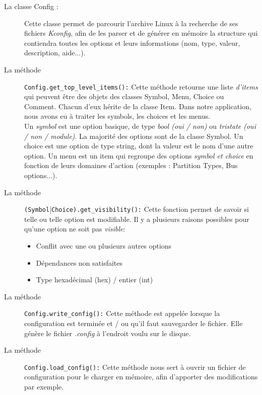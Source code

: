 \documentclass[17pts]{report}
\begin{document}
\begin{description}
    \item[La classe Config :] Cette classe permet de parcourir l'archive Linux
        à la recherche de ses fichiers \textit{Kconfig}, afin de les parser et
        de générer en mémoire la structure qui contiendra toutes les options et
        leurs informations (nom, type, valeur, description, aide...).
    \item[La méthode ] \verb|Config.get_top_level_items():| Cette méthode
        retourne une liste \textit{d'items} qui peuvent être des objets des
        classes Symbol, Menu, Choice ou Comment. Chacun d'eux hérite de la
        classe Item.  Dans notre application, nous avons eu à traiter les
        symbols, les choices et les menus.\\

        Un \textit{symbol} est une option basique, de type \textit{bool (oui /
        non)} ou \textit{tristate (oui / non / module)}. La majorité des
        options sont de la classe Symbol.  Un choice est une option de type
        string, dont la valeur est le nom d'une autre option.  Un menu est un
        item qui regroupe des options \textit{symbol et choice} en fonction de
        leurs domaines d'action (exemples : Partition Types, Bus options...).
    \item[La méthode ] \verb|(Symbol||\verb|Choice).get_visibility():| Cette
        fonction permet  de savoir si telle ou telle option est modifiable. Il
        y a plusieurs raisons possibles pour qu'une option ne soit pas
        \textit{visible}:
        \begin{itemize}
            \item Conflit avec une ou plusieurs autres options
            \item Dépendances non satisfaites
            \item Type hexadécimal (hex) / entier (int) \newline
        \end{itemize}
    \item[La méthode ] \verb|Config.write_config():| Cette méthode est appelée
        lorsque la configuration est terminée et / ou qu'il faut sauvegarder le
        fichier. Elle génère le fichier \textit{.config} à l'endroit voulu sur
        le disque. \newline
    \item[La méthode ] \verb|Config.load_config():| Cette méthode nous sert à
        ouvrir un fichier de configuration pour le charger en mémoire, afin
        d'apporter des modifications par exemple.
\end{description}
\end{document}

